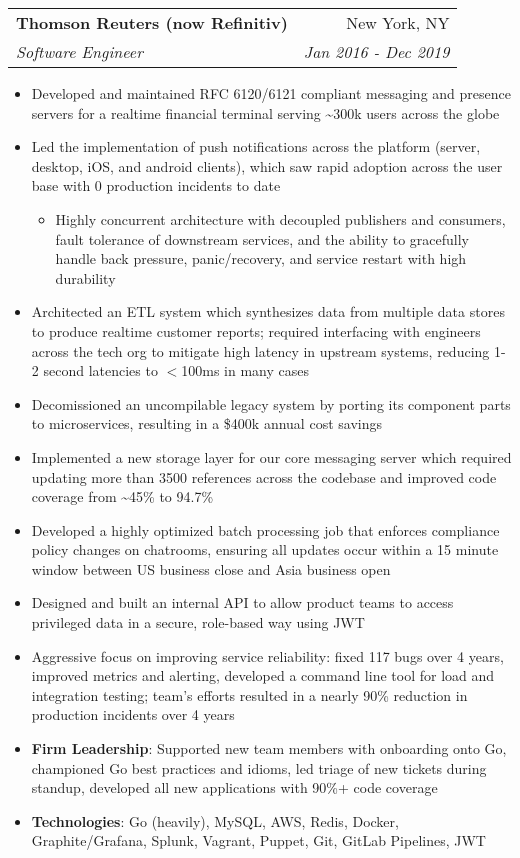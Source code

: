 \documentclass[letterpaper,11pt]{article}
\makeatletter
\newcommand{\resumeItem}[2]{
  \item\small{
    \textbf{#1}{: #2 \vspace{-1.5pt}}
  }
}
\newcommand{\resumeItemSimple}[1]{
  \item\small{
    {#1 \vspace{-1.5pt}}
  }
}
\newcommand{\resumeItemSimpleIndented}[1]{
  \item[--]\small{
    {#1 \vspace{-1.5pt}}
  }
}
\newcommand{\resumeSubheading}[4]{
  \vspace{-1pt}\item
    \begin{tabular*}{0.97\textwidth}[t]{l@{\extracolsep{\fill}}r}
      \textbf{#1} & #2 \\
      \textit{\small#3} & \textit{\small #4} \\
    \end{tabular*}\vspace{-5pt}
}
\newcommand{\resumeItemListStart}{\begin{itemize}}
\newcommand{\resumeItemListEnd}{\end{itemize}\vspace{-5pt}}
\makeatother
\begin{document}
    \resumeSubheading
      {Thomson Reuters (now Refinitiv)}{New York, NY}
      {Software Engineer}{Jan 2016 - Dec 2019}
      \resumeItemListStart
        \resumeItemSimple
          {Developed and maintained RFC 6120/6121 compliant messaging and presence servers for a realtime financial terminal serving \raisebox{-0.7ex}\textasciitilde 300k users across the globe}
        \resumeItemSimple
          {Led the implementation of push notifications across the platform (server, desktop, iOS, and android clients), which saw rapid adoption across the user base with 0 production incidents to date}
        \begin{itemize}[leftmargin=.2in]\resumeItemSimpleIndented
          {Highly concurrent architecture with decoupled publishers and consumers, fault tolerance of downstream services, and the ability to gracefully handle back pressure, panic/recovery, and service restart with high durability}
        \end{itemize}
        \resumeItemSimple
          {Architected an ETL system which synthesizes data from multiple data stores to produce realtime customer reports; required interfacing with engineers across the tech org to mitigate high latency in upstream systems, reducing 1-2 second latencies to $<$100ms in many cases}
        \resumeItemSimple
          {Decomissioned an uncompilable legacy system by porting its component parts to microservices, resulting in a \$400k annual cost savings}
        \resumeItemSimple
          {Implemented a new storage layer for our core messaging server which required updating more than 3500 references across the codebase and improved code coverage from \raisebox{-0.7ex}\textasciitilde 45\% to 94.7\%}
        \resumeItemSimple
          {Developed a highly optimized batch processing job that enforces compliance policy changes on chatrooms, ensuring all updates occur within a 15 minute window between US business close and Asia business open}
        \resumeItemSimple
          {Designed and built an internal API to allow product teams to access privileged data in a secure, role-based way using JWT}
        \resumeItemSimple
          {Aggressive focus on improving service reliability: fixed 117 bugs over 4 years, improved metrics and alerting, developed a command line tool for load and integration testing; team's efforts resulted in a nearly 90\% reduction in production incidents over 4 years}
        \resumeItem{Firm Leadership}
        {Supported new team members with onboarding onto Go, championed Go best practices and idioms, led triage of new tickets during standup, developed all new applications with 90\%+ code coverage}
        \resumeItem{Technologies}
        {Go (heavily), MySQL, AWS, Redis, Docker, Graphite/Grafana, Splunk, Vagrant, Puppet, Git, GitLab Pipelines, JWT}
      \resumeItemListEnd
\end{document}

